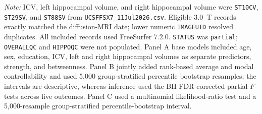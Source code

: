 \documentclass{article}
\providecommand{\DIFchgbeginFL}{}
\providecommand{\DIFchgendFL}{}
\begin{document}
\begin{table}[!htbp]
\vspace{1mm}
 \DIFchgbeginFL \footnotesize{\textit{Note:} ICV, left hippocampal volume, and right hippocampal volume were \texttt{ST10CV}, \texttt{ST29SV}, and \texttt{ST88SV} from \texttt{UCSFFSX7\_11Jul2026.csv}. Eligible 3.0~T records exactly matched the diffusion-MRI date; lower numeric \texttt{IMAGEUID} resolved duplicates. All included records used FreeSurfer 7.2.0. \texttt{STATUS} was \texttt{partial}; \texttt{OVERALLQC} and \texttt{HIPPOQC} were not populated. Panel A base models included age, sex, education, ICV, left and right hippocampal volumes as separate predictors, strength, and betweenness. Panel B jointly added rank-based average and modal controllability and used 5,000 group-stratified percentile bootstrap resamples; the intervals are descriptive, whereas inference used the BH-FDR-corrected partial \(F\)-tests across five outcomes. Panel C used a multinomial likelihood-ratio test and a 5,000-resample group-stratified percentile-bootstrap interval.}
\endgroup
\DIFchgendFL 

\end{table}
\end{document}
